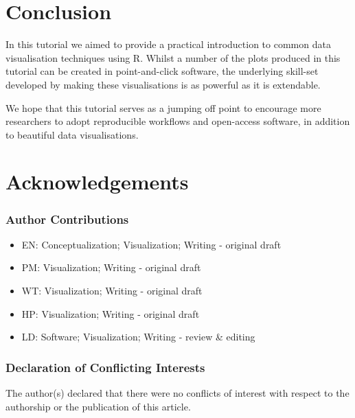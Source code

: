 \documentclass[
  english,
  doc,floatsintext]{apa6}
\providecommand{\tightlist}{%
  \setlength{\itemsep}{0pt}\setlength{\parskip}{0pt}}
\begin{document}
\hypertarget{conclusion}{%
\section{Conclusion}\label{conclusion}}

In this tutorial we aimed to provide a practical introduction to common data visualisation techniques using R. Whilst a number of the plots produced in this tutorial can be created in point-and-click software, the underlying skill-set developed by making these visualisations is as powerful as it is extendable.

We hope that this tutorial serves as a jumping off point to encourage more researchers to adopt reproducible workflows and open-access software, in addition to beautiful data visualisations.

\hypertarget{acknowledgements}{%
\section{Acknowledgements}\label{acknowledgements}}

\hypertarget{author-contributions}{%
\subsubsection{Author Contributions}\label{author-contributions}}

\begin{itemize}
\tightlist
\item
  EN: Conceptualization; Visualization; Writing - original draft
\item
  PM: Visualization; Writing - original draft
\item
  WT: Visualization; Writing - original draft
\item
  HP: Visualization; Writing - original draft
\item
  LD: Software; Visualization; Writing - review \& editing
\end{itemize}

\hypertarget{declaration-of-conflicting-interests}{%
\subsubsection{Declaration of Conflicting Interests}\label{declaration-of-conflicting-interests}}

The author(s) declared that there were no conflicts of interest with respect to the authorship or the publication of this article.
\end{document}
